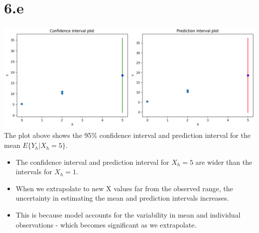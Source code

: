 \documentclass[12pt]{article}
\begin{document}
\section*{6.e}
\includegraphics*[width=\linewidth]{graph6e}
The plot above shows the 95\% confidence interval and prediction interval for the
mean \(E\{Y_h|X_h = 5\}\).
\begin{itemize}
    \item The confidence interval and prediction interval for \(X_h = 5\) are
    wider than the intervals for \(X_h = 1\).
    \item When we extrapolate to new X values far from the observed range,
    the uncertainty in estimating the mean and prediction intervals increases.
    \item  This is because model accounts for the variability in mean and
    individual observations - which becomes significant as we extrapolate.
\end{itemize}

\newpage
\end{document}
